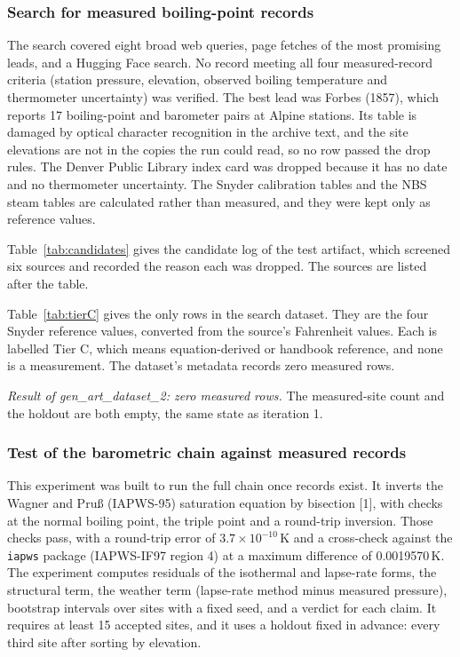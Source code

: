 \documentclass[11pt,letterpaper]{article}
\begin{document}
\subsubsection{Search for measured boiling-point records}

The search covered eight broad web queries, page fetches of the most promising leads, and a Hugging Face search. No record meeting all four measured-record criteria (station pressure, elevation, observed boiling temperature and thermometer uncertainty) was verified. The best lead was Forbes (1857), which reports 17 boiling-point and barometer pairs at Alpine stations. Its table is damaged by optical character recognition in the archive text, and the site elevations are not in the copies the run could read, so no row passed the drop rules. The Denver Public Library index card was dropped because it has no date and no thermometer uncertainty. The Snyder calibration tables and the NBS steam tables are calculated rather than measured, and they were kept only as reference values.

Table~\ref{tab:candidates} gives the candidate log of the test artifact, which screened six sources and recorded the reason each was dropped. The sources are listed after the table.




Table~\ref{tab:tierC} gives the only rows in the search dataset. They are the four Snyder reference values, converted from the source's Fahrenheit values. Each is labelled Tier C, which means equation-derived or handbook reference, and none is a measurement. The dataset's metadata records zero measured rows.



\emph{Result of gen\_art\_dataset\_2: zero measured rows.} The measured-site count and the holdout are both empty, the same state as iteration 1.

\subsubsection{Test of the barometric chain against measured records}

This experiment was built to run the full chain once records exist. It inverts the Wagner and Pru\ss{} (IAPWS-95) saturation equation by bisection [1], with checks at the normal boiling point, the triple point and a round-trip inversion. Those checks pass, with a round-trip error of $3.7 \times 10^{-10}$\,K and a cross-check against the \texttt{iapws} package (IAPWS-IF97 region 4) at a maximum difference of 0.0019570\,K. The experiment computes residuals of the isothermal and lapse-rate forms, the structural term, the weather term (lapse-rate method minus measured pressure), bootstrap intervals over sites with a fixed seed, and a verdict for each claim. It requires at least 15 accepted sites, and it uses a holdout fixed in advance: every third site after sorting by elevation.
\end{document}
